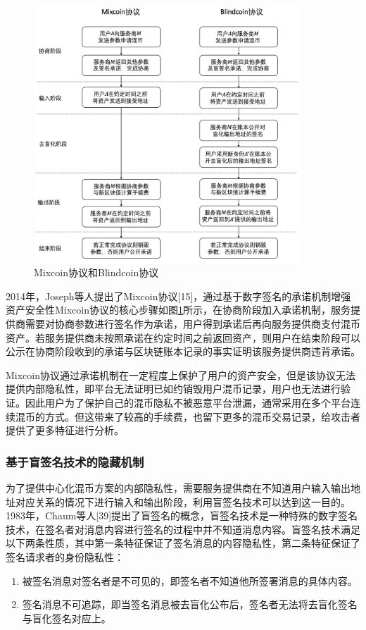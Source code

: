 \begin{figure}
\centering
\includegraphics[width=10cm]{figures/mixcoin-blindcoin.png}
\caption{Mixcoin协议和Blindcoin协议}
\label{fig:mixcoin-blindcoin}
\end{figure}

2014年，Joseph等人提出了Mixcoin协议[15]，通过基于数字签名的承诺机制增强资产安全性Mixcoin协议的核心步骤如图\ref{fig:mixcoin-blindcoin}所示，在协商阶段加入承诺机制，服务提供商需要对协商参数进行签名作为承诺，用户得到承诺后再向服务提供商支付混币资产。若服务提供商未按照承诺在约定时间之前返回资产，则用户在结束阶段可以公示在协商阶段收到的承诺与区块链账本记录的事实证明该服务提供商违背承诺。
	
Mixcoin协议通过承诺机制在一定程度上保护了用户的资产安全，但是该协议无法提供内部隐私性，即平台无法证明已如约销毁用户混币记录，用户也无法进行验证。因此用户为了保护自己的混币隐私不被恶意平台泄漏，通常采用在多个平台连续混币的方式。但这带来了较高的手续费，也留下更多的混币交易记录，给攻击者提供了更多特征进行分析。

\subsubsection{基于盲签名技术的隐藏机制}
为了提供中心化混币方案的内部隐私性，需要服务提供商在不知道用户输入输出地址对应关系的情况下进行输入和输出阶段，利用盲签名技术可以达到这一目的。1983年，Chaum等人[39]提出了盲签名的概念，盲签名技术是一种特殊的数字签名技术，在签名者对消息内容进行签名的过程中并不知道消息内容。盲签名技术满足以下两条性质，其中第一条特征保证了签名消息的内容隐私性，第二条特征保证了签名请求者的身份隐私性：
\begin{enumerate}
	\item 被签名消息对签名者是不可见的，即签名者不知道他所签署消息的具体内容。
	\item 签名消息不可追踪，即当签名消息被去盲化公布后，签名者无法将去盲化签名与盲化签名对应上。
\end{enumerate}

